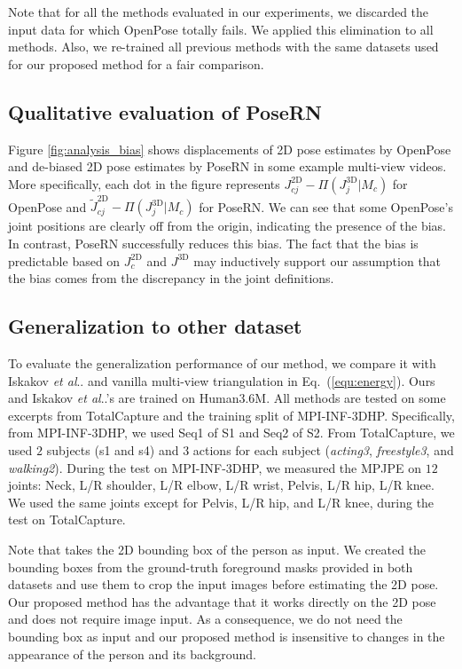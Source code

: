 \documentclass{article}
\makeatletter
\DeclareRobustCommand\onedot{\futurelet\@let@token\@onedot}
\def\@onedot{\ifx\@let@token.\else.\null\fi\xspace}
\def\etal{\emph{et al}\onedot}
\makeatother
\begin{document}
Note that for all the methods evaluated in our experiments, we discarded the input data for which OpenPose totally fails.
We applied this elimination to all methods. Also, we re-trained all previous methods with the same datasets used for our proposed method for a fair comparison.  

\vspace{-0.2cm}
\subsection{Qualitative evaluation of PoseRN}
\vspace{-0.1cm}
Figure \ref{fig:analysis_bias} shows displacements of 2D pose estimates by OpenPose and de-biased 2D pose estimates by PoseRN in some example multi-view videos. More specifically, each dot in the figure represents $J^\text{2D}_{cj} - \Pi(J^\text{3D}_{j}|M_c)$ for OpenPose and $\tilde{J}^\text{2D}_{cj} - \Pi(J^\text{3D}_{j}|M_c)$ for PoseRN. We can see that some OpenPose's joint positions are clearly off from the origin, indicating the presence of the bias. In contrast, PoseRN successfully reduces this bias. The fact that the bias is predictable based on $J^\text{2D}_c$ and $J^\text{3D}$ may inductively support our assumption that the bias comes from the discrepancy in the joint definitions. 

\vspace{-0.2cm}
\subsection{Generalization to other dataset}\label{sec:exp_other_dataset}
\vspace{-0.1cm}
To evaluate the generalization performance of our method, we compare it with Iskakov \etal \cite{iskakov2019learnable} and vanilla multi-view triangulation in Eq.~(\ref{equ:energy}). Ours and Iskakov \etal's are trained on Human3.6M. All methods are tested on some excerpts from TotalCapture and the training split of MPI-INF-3DHP. Specifically, from MPI-INF-3DHP, we used Seq1 of S1 and Seq2 of S2.
From TotalCapture, we used $2$ subjects (s1 and s4) and $3$ actions for each subject (\textit{acting3}, \textit{freestyle3}, and \textit{walking2}). During the test on MPI-INF-3DHP, we measured the MPJPE on $12$ joints: Neck, L/R shoulder, L/R elbow, L/R wrist, Pelvis, L/R hip, L/R knee. We used the same joints except for Pelvis, L/R hip, and L/R knee, during the test on TotalCapture.

Note that \cite{iskakov2019learnable} takes the 2D bounding box of the person as input. We created the bounding boxes from the ground-truth foreground masks provided in both datasets and use them to crop the input images before estimating the 2D pose. Our proposed method has the advantage that it works directly on the 2D pose and does not require image input. As a consequence, we do not need the bounding box as input and our proposed method is insensitive to changes in the appearance of the person and its background. 
\end{document}
